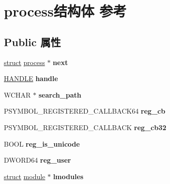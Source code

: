 \hypertarget{structprocess}{}\section{process结构体 参考}
\label{structprocess}
\subsection*{Public 属性}
\begin{DoxyCompactItemize}
\item 
\mbox{\label{structprocess_aa714b70ab9ca99fc489de2f70a091b0b}} 
\hyperlink{interfacestruct}{struct} \hyperlink{structprocess}{process} $\ast$ {\bfseries next}
\item 
\mbox{\label{structprocess_a2fce43f307cb3290e071940c73ddaecf}} 
\hyperlink{interfacevoid}{H\+A\+N\+D\+LE} {\bfseries handle}
\item 
\mbox{\label{structprocess_af6e7b7b5f79300c59cd1c99b0f740757}} 
W\+C\+H\+AR $\ast$ {\bfseries search\+\_\+path}
\item 
\mbox{\label{structprocess_a31fa40d459b54fcd56d90222dd94af39}} 
P\+S\+Y\+M\+B\+O\+L\+\_\+\+R\+E\+G\+I\+S\+T\+E\+R\+E\+D\+\_\+\+C\+A\+L\+L\+B\+A\+C\+K64 {\bfseries reg\+\_\+cb}
\item 
\mbox{\label{structprocess_a9eb0e0e5d5525289f0d4766aaf8c95aa}} 
P\+S\+Y\+M\+B\+O\+L\+\_\+\+R\+E\+G\+I\+S\+T\+E\+R\+E\+D\+\_\+\+C\+A\+L\+L\+B\+A\+CK {\bfseries reg\+\_\+cb32}
\item 
\mbox{\label{structprocess_a6e485197598f20071a955e7661f6ed5d}} 
B\+O\+OL {\bfseries reg\+\_\+is\+\_\+unicode}
\item 
\mbox{\label{structprocess_ae594aaf7c1054c0d195ec13d1a5b7766}} 
D\+W\+O\+R\+D64 {\bfseries reg\+\_\+user}
\item 
\mbox{\label{structprocess_a3a768af9770859378fce25b7e1ad8f31}} 
\hyperlink{interfacestruct}{struct} \hyperlink{structmodule}{module} $\ast$ {\bfseries lmodules}
\item 
\mbox{\label{structprocess_ac72ba3a20c55a584e3746a0659742461}} 

\end{DoxyCompactItemize}
